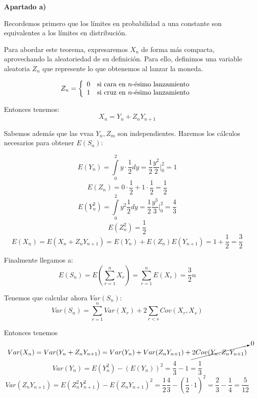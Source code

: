 \documentclass[openany]{book}
\begin{document}
\begin{exercise}
    $  $

    \begin{flushright}
        \textbf{Apartado a)}
    \end{flushright}
    

    Recordemos primero que los límites en probabilidad a una constante son equivalentes a los límites en distribución.

    Para abordar este teorema, expresaremos $ X_n $ de forma más compacta, aprovechando la aleatoriedad de su definición. Para ello, definimos una variable aleatoria $ Z_n $ que represente lo que obtenemos al lanzar la moneda.

    $$ Z_n = \left\{
    \begin{array}{ll}
        0 & \text{si cara en $ n $-ésimo lanzamiento}\\ 
        1 & \text{si cruz en $ n $-ésimo lanzamiento}\\ 
    \end{array}
    \right. $$

    Entonces tenemos:
    $$ X_n = Y_n+Z_nY_{n+1} $$

    Sabemos además que las vvaa $ Y_n,Z_m $ son independientes. Haremos los cálculos necesarios para obtener $ E(S_n)$:

    $$ E(Y_n) = \int\limits_{0}^{2} y\cdot \dfrac{1}{2}dy = \dfrac{1}{2} \dfrac{y^2}{2} \Biggr|_{0}^{2} = 1 $$
    $$ E(Z_n) = 0\cdot \dfrac{1}{2} + 1\cdot \dfrac{1}{2} = \dfrac{1}{2} $$
    $$ E(Y_n^2) = \int\limits_{0}^{2}y^2\dfrac{1}{2}dy = \dfrac{1}{2} \dfrac{y^3}{3} \Biggr|_{0}^{2} = \dfrac{4}{3} $$
    $$ E(Z_n^2) = \dfrac{1}{2} $$
    $$ E(X_{n}) = E(X_n+Z_nY_{n+1}) = E(Y_n)+E(Z_n)E(Y_{n+1}) = 1+\dfrac{1}{2} = \dfrac{3}{2} $$


    Finalmente llegamos a:
    $$ E(S_n) = E\left(\sum\limits_{r=1}^{n}X_{r}\right) = \sum\limits_{r=1}^{n}E(X_{r}) = \dfrac{3}{2}n $$

    Tenemos que calcular ahora $ Var(S_n) $:
    $$ Var(S_n) = \sum\limits_{r=1}^{n}Var(X_{r}) +2 \sum\limits_{r<s}^{}Cov(X_{r},X_{s}) $$

    Entonces tenemos
    $$ Var(X_n) = Var(Y_n+Z_nY_{n+1}) = Var(Y_n)+Var(Z_nY_{n+1}) +\cancelto{0}{2Cov(Y_n,Z_nY_{n+1})} $$
    $$ Var(Y_n) = E(Y_n^2)-(E(Y_n))^2 = \dfrac{4}{3}-1 = \dfrac{1}{3}$$
    $$ Var(Z_nY_{n+1}) = E(Z_n^2Y_{n+1}^2)-E(Z_nY_{n+1})^2 = \dfrac{1}{2}\dfrac{4}{3}-\left(\dfrac{1}{2}\cdot 1\right)^2 = \dfrac{2}{3}-\dfrac{1}{4} = \dfrac{5}{12} $$


\end{exercise}
\end{document}
